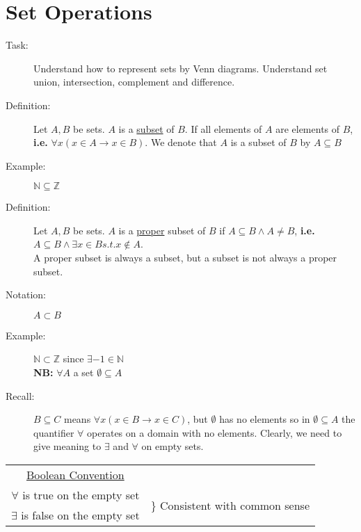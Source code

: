 \documentclass[10pt]{article}
\begin{document}
	\section{Set Operations}
	\begin{description}
		\item[Task:] Understand how to represent sets by Venn diagrams. Understand set union, intersection, complement and difference.
		\item[Definition:] Let $A, B$ be sets. $A$ is a \underline{subset} of $B$. If all elements of $A$ are elements of $B$, \textbf{i.e.} $\forall x(x \in A \rightarrow x \in B)$. We denote that $A$ is a subset of $B$ by $A \subseteq B$
		\item[Example:] $\mathbb{N} \subseteq \mathbb{Z}$
		\item[Definition:] Let $A, B$ be sets. $A$ is a \underline{proper} subset of $B$ if $A \subseteq B \land A \neq B$, \textbf{i.e.} $A \subseteq B \land \exists x \in B s.t. x \notin A$. \\ A proper subset is always a subset, but a subset is not always a proper subset.
		\item[Notation:] $A \subset B$
		\item[Example:] $\mathbb{N} \subset \mathbb{Z}$ since $\exists -1 \in \mathbb{N}$ \\ \textbf{NB:} $\forall A$ a set $\emptyset \subseteq A$
		\item[Recall:] $B \subseteq C$ means $\forall x(x \in B \rightarrow x \in C)$, but $\emptyset$ has no elements so in $\emptyset \subseteq A$ the quantifier $\forall$ operates on a domain with no elements. Clearly, we need to give meaning to $\exists$ and $\forall$ on empty sets.
	\end{description}
	
	\begin{tabular}{cc}
		\underline{Boolean Convention} \\
		$\forall$ is true on the empty set & \multirow{2}{6cm}{\LARGE\} \normalsize Consistent with common sense} \\
		$\exists$ is false on the empty set
	\end{tabular}
	
\end{document}
